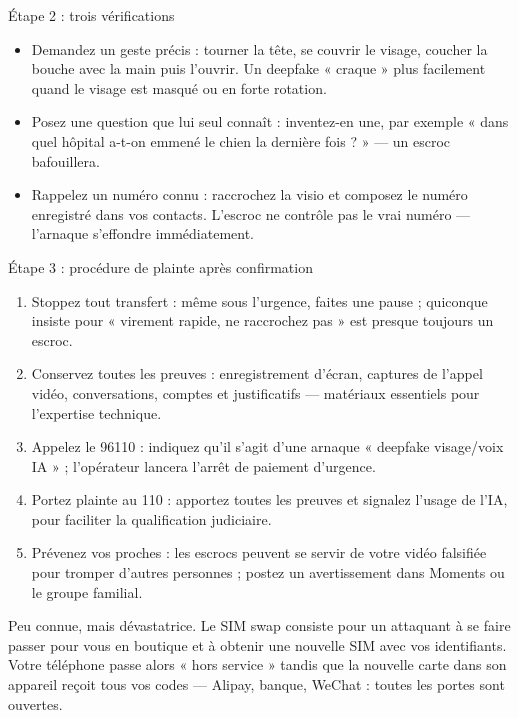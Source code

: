 \begin{tcbinfo}{Étape 2 : trois vérifications}
\begin{itemize}
  \item Demandez un geste précis : tourner la tête, se couvrir le visage, coucher la bouche avec la main puis l'ouvrir. Un deepfake « craque » plus facilement quand le visage est masqué ou en forte rotation.
  \item Posez une question que lui seul connaît : inventez-en une, par exemple « dans quel hôpital a-t-on emmené le chien la dernière fois ? » — un escroc bafouillera.
  \item Rappelez un numéro connu : raccrochez la visio et composez le numéro enregistré dans vos contacts. L'escroc ne contrôle pas le vrai numéro — l'arnaque s'effondre immédiatement.
\end{itemize}

\end{tcbinfo}

\begin{tcbwarn}{Étape 3 : procédure de plainte après confirmation}
\begin{enumerate}
  \item Stoppez tout transfert : même sous l'urgence, faites une pause ; quiconque insiste pour « virement rapide, ne raccrochez pas » est presque toujours un escroc.
  \item Conservez toutes les preuves : enregistrement d'écran, captures de l'appel vidéo, conversations, comptes et justificatifs — matériaux essentiels pour l'expertise technique.
  \item Appelez le 96110 : indiquez qu'il s'agit d'une arnaque « deepfake visage/voix IA » ; l'opérateur lancera l'arrêt de paiement d'urgence.
  \item Portez plainte au 110 : apportez toutes les preuves et signalez l'usage de l'IA, pour faciliter la qualification judiciaire.
  \item Prévenez vos proches : les escrocs peuvent se servir de votre vidéo falsifiée pour tromper d'autres personnes ; postez un avertissement dans Moments ou le groupe familial.
\end{enumerate}

\end{tcbwarn}


Peu connue, mais dévastatrice. Le SIM swap consiste pour un attaquant à se faire passer pour vous en boutique et à obtenir une nouvelle SIM avec vos identifiants. Votre téléphone passe alors « hors service » tandis que la nouvelle carte dans son appareil reçoit tous vos codes — Alipay, banque, WeChat : toutes les portes sont ouvertes.

